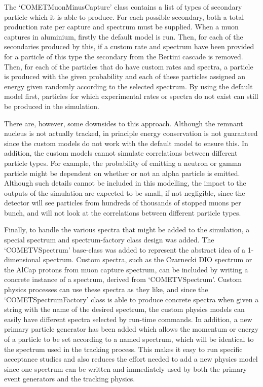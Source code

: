 The `COMETMuonMinusCapture' class contains a list of types of secondary particle which it is able to produce.  
For each possible secondary, both a total production rate per capture and spectrum must be supplied.
When a muon captures in aluminium, firstly the default model is run.
Then, for each of the secondaries produced by this, if a custom rate and spectrum have been provided for a particle of this type the secondary from the Bertini cascade is removed.
Then, for each of the particles that do have custom rates and spectra, a particle is produced with the given probability and each of these particles assigned an energy given randomly according to the selected spectrum.
By using the default model first, particles for which experimental rates or spectra do not exist can still be produced in the simulation.

There are, however, some downsides to this approach.
Although the remnant nucleus is not actually tracked, in principle energy conservation is not guaranteed since the custom models do not work with the default model to ensure this.
In addition, the custom models cannot simulate correlations between different particle types. 
For example, the probability of emitting a neutron or gamma particle might be dependent on whether or not an alpha particle is emitted. 
Although such details cannot be included in this modelling, the impact to the outputs of the simulation are expected to be small, if not negligible, since the detector will see particles from hundreds of thousands of stopped muons per bunch, and will not look at the correlations between different particle types.

Finally, to handle the various spectra that might be added to the simulation, a special spectrum and spectrum-factory class design was added.
The `COMETVSpectrum' base-class was added to represent the abstract idea of a 1-dimensional spectrum.
Custom spectra, such as the Czarnecki \ac{DIO} spectrum or the AlCap protons from muon capture spectrum, can be included by writing a concrete instance of a spectrum, derived from `COMETVSpectrum'.
Custom physics processes can use these spectra as they like, and since the `COMETSpectrumFactory' class is able to produce concrete spectra when given a string with the name of the desired spectrum, the custom physics models can easily have different spectra selected by run-time commands.
In addition, a new primary particle generator has been added which allows the momentum or energy of a particle to be set according to a named spectrum, which will be identical to the spectrum used in the tracking process.
This makes it easy  to run specific acceptance studies and also reduces the effort needed to add a new physics model since one spectrum can be written and immediately used by both the primary event generators and the tracking physics.

